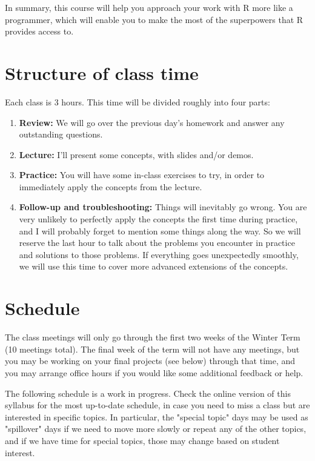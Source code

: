 \documentclass{tufte-handout}
\begin{document}
In summary, this course will help you approach your work with R more like a programmer, which will enable you to make the most of the superpowers that R provides access to.
\section*{Structure of class time}
\label{sec:orgheadline4}
Each class is 3 hours.  This time will be divided roughly into four parts:
\begin{enumerate}
\item \textbf{Review:} We will go over the previous day's homework and answer any outstanding questions.
\item \textbf{Lecture:} I'll present some concepts, with slides and/or demos.
\item \textbf{Practice:} You will have some in-class exercises to try, in order to immediately apply the concepts from the lecture.
\item \textbf{Follow-up and troubleshooting:} Things will inevitably go wrong. You are very unlikely to perfectly apply the concepts the first time during practice, and I will probably forget to mention some things along the way. So we will reserve the last hour to talk about the problems you encounter in practice and solutions to those problems.  If everything goes unexpectedly smoothly, we will use this time to cover more advanced extensions of the concepts.
\end{enumerate}
\section*{Schedule}
\label{sec:orgheadline5}
The class meetings will only go through the first two weeks of the Winter Term (10 meetings total). The final week of the term will not have any meetings, but you may be working on your final projects (see below) through that time, and you may arrange office hours if you would like some additional feedback or help.

The following schedule is a work in progress.  Check the online version of this syllabus for the most up-to-date schedule, in case you need to miss a class but are interested in specific topics. In particular, the "special topic" days may be used as "spillover" days if we need to move more slowly or repeat any of the other topics, and if we have time for special topics, those may change based on student interest.
\end{document}
